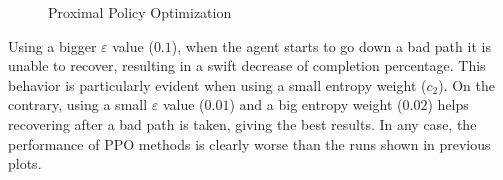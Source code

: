 \documentclass[a4paper, 12pt]{article}
\numberwithin{equation}{section}
\begin{document}
\begin{figure}[H]
	\centering
		\caption{Proximal Policy Optimization}
	\label{fig:plot-ppo}
\end{figure}

Using a bigger $\varepsilon$ value ($0.1$), when the agent starts to go down a bad path it is unable to recover, resulting in a swift decrease of completion percentage. This behavior is particularly evident when using a small entropy weight ($c_2$). On the contrary, using a small $\varepsilon$ value ($0.01$) and a big entropy weight ($0.02$) helps recovering after a bad path is taken, giving the best results. In any case, the performance of PPO methods is clearly worse than the runs shown in previous plots.






















\clearpage
\printbibliography[heading=bibintoc]
\end{document}
